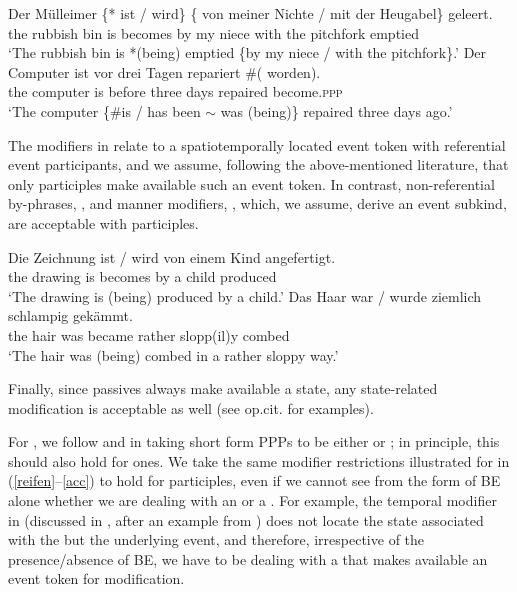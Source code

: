 \documentclass[output=paper,modfonts,newtxmath,hidelinks
\ChapterDOI{10.5281/zenodo.2545513}
]{langscibook}
\begin{document}
\ea\label{reifen}
\ea\gll	Der M\"{u}lleimer \{*\hspace{-2pt} ist / wird\} \{\hspace{-2pt} von meiner Nichte / mit der Heugabel\} geleert.\\
	the {rubbish bin} {} is {} becomes {} by my niece {} with the pitchfork emptied\\
\glt	`The rubbish bin is *(being) emptied \{by my niece / with the pitchfork\}.'
\ex\gll	Der Computer ist vor drei Tagen repariert \#(\hspace{-2pt} worden).\\
	the computer is before three days repaired {} become.\textsc{ppp} \\
\glt	`The computer \{\#is / has been $\sim$ was (being)\} repaired three days ago.'
\z\z

\noindent The modifiers in  relate to a spatiotemporally located event token with referential event participants, and we assume, following the above-mentioned literature, that only  participles make available such an event token. In contrast, non-referential by-phrases, , and manner modifiers, , which, we assume,  derive an event subkind, are acceptable with  participles. 

\ea\label{acc}
\ea\gll	Die Zeichnung ist / wird von einem Kind angefertigt.\label{zeichnung}\\
	the drawing is {} becomes by a child produced \\
\glt	`The drawing is (being) produced by a child.'
\ex\gll	Das Haar war / wurde ziemlich schlampig gek\"{a}mmt.\label{schlampig}\\
	the hair was {} became rather slopp(il)y combed\\
\glt	`The hair was (being) combed in a rather sloppy way.'
\z\z

\noindent Finally, since  passives always make available a state, any state-related modification is acceptable as well (see op.cit. for examples).

For , we follow \citet{schoorlemmer95} and \citet{borik13, borik14} in  taking short form  PPPs to be either  or ; in principle, this should also hold for  ones. We take the same modifier restrictions illustrated for  in (\ref{reifen}--\ref{acc}) to hold for   participles, even if we cannot see from the form of BE alone whether we are dealing with an  or a  . For example, the temporal modifier in  (discussed in \citealt{borik14}, after an example from \citealt{paslawskastechow}) does not locate the state associated with the  but the underlying event, and therefore, irrespective of the presence/absence of BE, we have to be dealing with a   that makes available an event token for modification.
\end{document}
